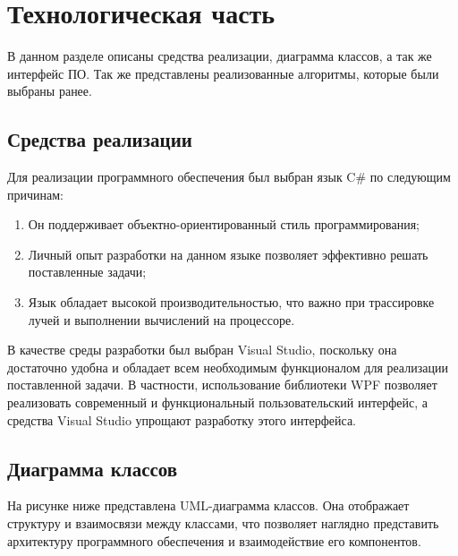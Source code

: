 \chapter{Технологическая часть}

В данном разделе описаны средства реализации, диаграмма классов, а так же интерфейс ПО. Так же представлены реализованные алгоритмы, которые были выбраны ранее.

\section{Средства реализации}
Для реализации программного обеспечения был выбран язык C\# по следующим причинам:
\begin{enumerate}
	\item Он поддерживает объектно-ориентированный стиль программирования;
	\item Личный опыт разработки на данном языке позволяет эффективно решать поставленные задачи;
	\item Язык обладает высокой производительностью, что важно при трассировке лучей и выполнении вычислений на процессоре.
\end{enumerate}

В качестве среды разработки был выбран Visual Studio, поскольку она достаточно удобна и обладает всем необходимым функционалом для реализации поставленной задачи. В частности, использование библиотеки WPF позволяет реализовать современный и функциональный пользовательский интерфейс, а средства Visual Studio упрощают разработку этого интерфейса.

\section{Диаграмма классов}
На рисунке ниже представлена UML-диаграмма классов. Она отображает структуру и взаимосвязи между  классами, что позволяет наглядно представить архитектуру программного обеспечения и взаимодействие его компонентов.

